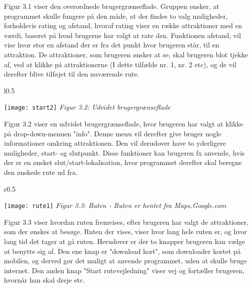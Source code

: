 Figur 3.1 viser den overordnede brugergrænseflade. Gruppen ønsker, at programmet skulle fungere på den måde, at der findes to valg muligheder, forholdsvis rating og afstand, hvoraf rating viser en række attraktioner med en værdi, baseret på hvad brugerne har valgt at rate den. Funktionen afstand, vil vise hvor stor en afstand der er fra det punkt hvor brugeren står, til en attraktion. De attraktioner, som brugeren ønsker at se, skal brugeren blot tjekke af, ved at klikke på attraktionerne (I dette tilfælde nr. 1, nr. 2 etc), og de vil derefter blive tilføjet til den nuværende rute. \newline

\begin{wrapfigure}{l}{0.5\textwidth}
  \vspace{-20pt}
  \begin{center}
    \texttt{[image: start2]} \newline
    \textit{Figur 3.2: Udvidet brugergrænseflade}\newline
  \end{center}
  \vspace{-20pt}
  \vspace{-10pt}
\end{wrapfigure}


Figur 3.2 viser en udvidet brugergrænseflade, hvor brugeren har valgt at klikke på drop-down-menuen "info". Denne menu vil derefter give bruger nogle informationer omkring attraktionen. Den vil derudover have to yderligere muligheder, start- og slutpunkt. Disse funktioner kan brugeren fx anvende, hvis der er en ønsket slut/start-lokalisation, hvor programmet derefter skal beregne den ønskede rute ud fra.\newline
\newpage

\begin{wrapfigure}{r}{0.5\textwidth}
  \vspace{-20pt}
  \begin{center}
    \texttt{[image: rute1]} \newline
    \textit{Figur 3.3: Ruten - Ruten er hentet fra Maps.Google.com}\newline
  \end{center}
  \vspace{-20pt}
  \vspace{-10pt}
\end{wrapfigure}

Figur 3.3 viser hvordan ruten fremvises, efter brugeren har valgt de attraktioner, som der ønskes at besøge. Ruten der vises, viser hvor lang hele ruten er, og hvor lang tid det tager at gå ruten. Herudover er der to knapper brugeren kan vælge at benytte sig af. Den ene knap er "download kort", som downloader kortet på mobilen, og derved gør det muligt at anvende programmet, uden at skulle bruge internet. Den anden knap "Start rutevejledning" viser vej og fortæller brugeren, hvornår han skal dreje etc. 
\newline
\newline
\newline
\newline
\newline
\newline

